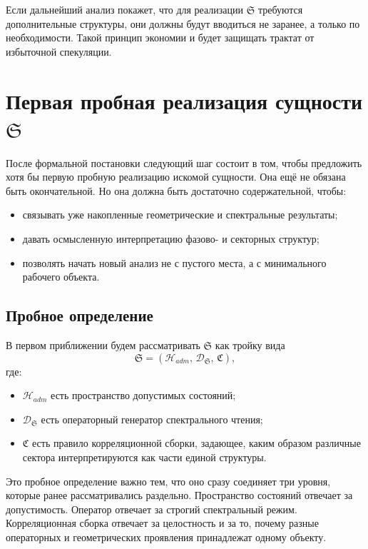 \documentclass[12pt,a4paper]{article}
\begin{document}
Если дальнейший анализ покажет, что для реализации \(\mathfrak{S}\) требуются дополнительные структуры, они должны будут вводиться не заранее, а только по необходимости. Такой принцип экономии и будет защищать трактат от избыточной спекуляции.

\section{Первая пробная реализация сущности \texorpdfstring{$\mathfrak{S}$}{S}}

После формальной постановки следующий шаг состоит в том, чтобы предложить хотя бы первую пробную реализацию искомой сущности. Она ещё не обязана быть окончательной. Но она должна быть достаточно содержательной, чтобы:
\begin{itemize}
    \item связывать уже накопленные геометрические и спектральные результаты;
    \item давать осмысленную интерпретацию фазово- и секторных структур;
    \item позволять начать новый анализ не с пустого места, а с минимального рабочего объекта.
\end{itemize}

\subsection{Пробное определение}

В первом приближении будем рассматривать \(\mathfrak{S}\) как тройку вида
\begin{equation}
\mathfrak{S} = (\mathcal{H}_{adm},\,\mathcal{D}_{\mathfrak{S}},\,\mathfrak{C}),
\end{equation}
где:
\begin{itemize}
    \item \(\mathcal{H}_{adm}\) есть пространство допустимых состояний;
    \item \(\mathcal{D}_{\mathfrak{S}}\) есть операторный генератор спектрального чтения;
    \item \(\mathfrak{C}\) есть правило корреляционной сборки, задающее, каким образом различные сектора интерпретируются как части единой структуры.
\end{itemize}

Это пробное определение важно тем, что оно сразу соединяет три уровня, которые ранее рассматривались раздельно. Пространство состояний отвечает за допустимость. Оператор отвечает за строгий спектральный режим. Корреляционная сборка отвечает за целостность и за то, почему разные операторных и геометрических проявления принадлежат одному объекту.
\end{document}
